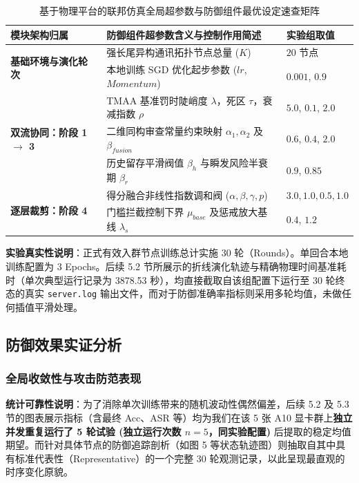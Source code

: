 \documentclass[11pt, a4paper, UTF8, fontset=fandol]{ctexart}
\begin{document}
\begin{table}[htbp]
\centering
\caption{基于物理平台的联邦仿真全局超参数与防御组件最优设定速查矩阵}
\label{tab:hyperparams}
\begin{tabular}{p{4cm} p{8.5cm} p{2cm}}
\toprule
\textbf{模块架构归属} & \textbf{防御组件超参数含义与控制作用简述} & \textbf{实验组取值} \\
\midrule
\multirow{2}{*}{\textbf{基础环境与演化轮次}} & 强长尾异构通讯拓扑节点总量 ($K$) & $20$ 节点 \\
& 本地训练 SGD 优化起步参数 ($lr$, $Momentum$) & $0.001$, $0.9$ \\
\midrule
\multirow{3}{*}{\textbf{双流协同：阶段 1 $\to$ 3}} & TMAA 基准罚时陡峭度 $\lambda$，死区 $\tau$，衰减指数 $\rho$ & $5.0$, $0.1$, $2.0$ \\
& 二维同构审查常量约束映射 $\alpha_1, \alpha_2$ 及 $\beta_{fusion}$ & $0.6$, $0.4$, $2.0$ \\
& 历史留存平滑阀值 $\beta_h$ 与瞬发风险半衰期 $\beta_r$ & $0.9$, $0.85$ \\
\midrule
\multirow{2}{*}{\textbf{逐层裁剪：阶段 4}} & 得分融合非线性指数调和阀 ($\alpha, \beta, \gamma, p$) & $3.0, 1.0, 0.5, 1.0$ \\
& 门槛拦截控制下界 $\mu_{base}$ 及惩戒放大基线 $\lambda_s$  & $0.4$, $1.2$ \\
\bottomrule
\end{tabular}
\end{table}

\textbf{实验真实性说明}：正式有效入群节点训练总计实施 $30$ 轮（Rounds）。单回合本地训练配置为 3 Epochs。后续 5.2 节所展示的折线演化轨迹与精确物理时间基准耗时（单次典型运行记录为 3878.53 秒），均直接截取自该组配置下运行至 30 轮终态的真实 \texttt{server.log} 输出文件，而对于防御准确率指标则采用多轮均值，未做任何插值平滑处理。

\subsection{防御效果实证分析}

\subsubsection{全局收敛性与攻击防范表现}
\textbf{统计可靠性说明}：为了消除单次训练带来的随机波动性偶然偏差，后续 5.2 及 5.3 节的图表展示指标（含最终 Acc、ASR 等）均为我们在该 5 张 A10 显卡群上\textbf{独立并发重复运行了 5 轮试验 (独立运行次数 $n=5$，同实验配置)} 后提取的稳定均值期望。而针对具体节点的防御追踪剖析（如图 5 等状态轨迹图）则抽取自其中具有标准代表性（Representative）的一个完整 30 轮观测记录，以此呈现最直观的时序变化原貌。
\end{document}
